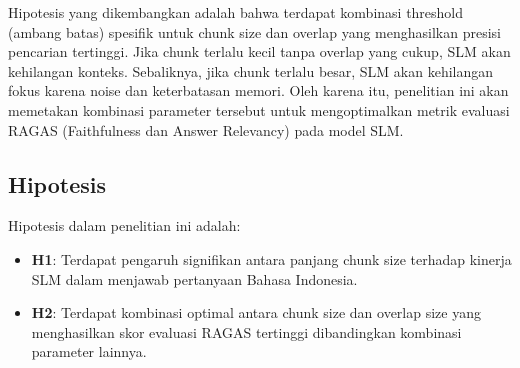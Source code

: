 Hipotesis yang dikembangkan adalah bahwa terdapat kombinasi threshold (ambang batas) spesifik untuk chunk size dan overlap yang menghasilkan presisi pencarian tertinggi. Jika chunk terlalu kecil tanpa overlap yang cukup, SLM akan kehilangan konteks. Sebaliknya, jika chunk terlalu besar, SLM akan kehilangan fokus karena noise dan keterbatasan memori. Oleh karena itu, penelitian ini akan memetakan kombinasi parameter tersebut untuk mengoptimalkan metrik evaluasi RAGAS (Faithfulness dan Answer Relevancy) pada model SLM.

\subsection{Hipotesis}
Hipotesis dalam penelitian ini adalah:
\begin{itemize}
    \item \textbf{H1}: Terdapat pengaruh signifikan antara panjang chunk size terhadap kinerja SLM dalam menjawab pertanyaan Bahasa Indonesia.
    \item \textbf{H2}: Terdapat kombinasi optimal antara chunk size dan overlap size yang menghasilkan skor evaluasi RAGAS tertinggi dibandingkan kombinasi parameter lainnya.
\end{itemize}
